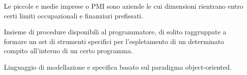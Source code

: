 \begin{acronym}[DBMS]
	{\small Le piccole e medie imprese o PMI sono aziende le cui dimensioni rientrano entro certi limiti occupazionali e finanziari prefissati. \par}
    	
	
	{\small Insieme di procedure disponibili al programmatore, di solito raggruppate a formare un set di strumenti specifici per l'espletamento di un determinato compito all'interno di un certo programma. \par}
	
	
	{\small  Linguaggio di modellazione e specifica basato sul paradigma object-oriented. \par}
\end{acronym}                      
